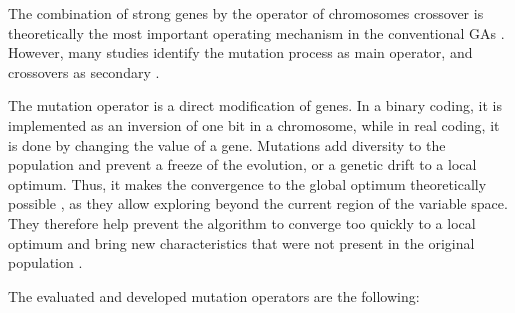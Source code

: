 \documentclass[twocol]{ametsoc}
\begin{document}
The combination of strong genes by the operator of chromosomes crossover is theoretically the most important operating mechanism in the conventional GAs \citep{Holland1992b,Back1993b}. However, many studies identify the mutation process as main operator, and crossovers as secondary \citep[see][]{Back1992a,Back1996a,Back1996b,Smith1997a,Deb1999,Haupt2004,Costa2005a,Costa2007a}.

The mutation operator is a direct modification of genes. In a binary coding, it is implemented as an inversion of one bit in a chromosome, while in real coding, it is done by changing the value of a gene. Mutations add diversity to the population and prevent a freeze of the evolution, or a genetic drift to a local optimum. Thus, it makes the convergence to the global optimum theoretically possible \citep{Beasley1993a}, as they allow exploring beyond the current region of the variable space. They therefore help prevent the algorithm to converge too quickly to a local optimum and bring new characteristics that were not present in the original population \citep{Haupt2004}. 

The evaluated and developed mutation operators are the following:
\end{document}
